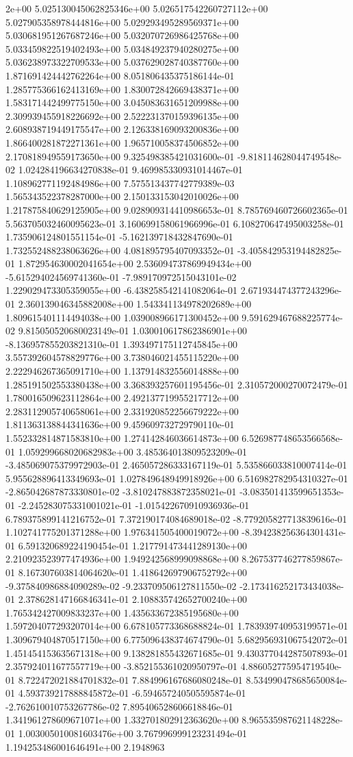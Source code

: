 2e+00	5.025130045062825346e+00	5.026517542260727112e+00	5.027905358978444816e+00	5.029293495289569371e+00	5.030681951267687246e+00	5.032070726986425768e+00	5.033459822519402493e+00	5.034849237940280275e+00	5.036238973322709533e+00	5.037629028740387760e+00
1.871691424442762264e+00	8.051806435375186144e-01	1.285775366162413169e+00	1.830072842669438371e+00	1.583171442499775150e+00	3.045083631651209988e+00	2.309939455918226692e+00	2.522231370159396135e+00	2.608938719449175547e+00	2.126338169093200836e+00	1.866400281872271361e+00	1.965710058374506852e+00	2.170818949559173650e+00	9.325498385421031600e-01	-9.818114628044749548e-02	1.024284196634270838e-01	9.469985330931014467e-01	1.108962771192484986e+00	7.575513437742779389e-03	1.565343522378287000e+00	2.150133153042010026e+00	1.217875840629125905e+00	9.028909314410986653e-01	8.785769460726602365e-01	5.563705032460095623e-01	3.160699158061966996e-01	6.108270647495003258e-01	1.735906124801551154e-01	-5.162139718432847690e-01	1.732552488238063626e+00	4.081895795407093352e-01	-3.405842953194482825e-01	1.872954630002041654e+00	2.536094737869949434e+00	-5.615294024569741360e-01	-7.989170972515043101e-02	1.229029473305359055e+00	-6.438258542141082064e-01	2.671934474377243296e-01	2.360139046345882008e+00	1.543341134978202689e+00	1.809615401114494038e+00	1.039008966171300452e+00	9.591629467688225774e-02	9.815050520680023149e-01	1.030010617862386901e+00	-8.136957855203821310e-01	1.393497175112745845e+00	3.557392604578829776e+00	3.738046021455115220e+00	2.222946267365091710e+00	1.137914832556014888e+00	1.285191502553380438e+00	3.368393257601195456e-01	2.310572000270072479e-01	1.780016509623112864e+00	2.492137719955217712e+00	2.283112905740658061e+00	2.331920852256679222e+00	1.811363138844341636e+00	9.459609732729790110e-01	1.552332814871583810e+00	1.274142846036614873e+00	6.526987748653566568e-01	1.059299668020682983e+00	3.485364013809523209e-01	-3.485069075379972903e-01	2.465057286333167119e-01	5.535866033810007414e-01	5.955628896413349693e-01	1.027849648949918926e+00	6.516982782954310327e-01	-2.865042687873330801e-02	-3.810247883872358021e-01	-3.083501413599651353e-01	-2.245283075331001021e-01	-1.015422670910936936e-01	6.789375899141216752e-01	7.372190174084689018e-02	-8.779205827713839616e-01	1.102741775201371288e+00	1.976341505400019072e+00	-8.394238256364301431e-01	6.591320689224190454e-01	1.217791473441289130e+00	2.210923523977474936e+00	1.949242568999098868e+00	8.267537746277859867e-01	8.167307603814064620e-01	1.418642697906752792e+00	-9.375840986884090289e-02	-9.233709506127811550e-02	-2.173416252173434038e-01	2.378628147166846341e-01	2.108835742652700240e+00	1.765342427009833237e+00	1.435633672385195680e+00	1.597204077293207014e+00	6.678105773368688824e-01	1.783939740953199571e-01	1.309679404870517150e+00	6.775096438374674790e-01	5.682956931067542072e-01	1.451454153635671318e+00	9.138281855432671685e-01	9.430377044287507893e-01	2.357924011677557719e+00	-3.852155361020950797e-01	4.886052775954719540e-01	8.722472021884701832e-01	7.884996167686080248e-01	8.534990478685650084e-01	4.593739217888845872e-01	-6.594657240505595874e-01	-2.762610010753267786e-02	7.895406528606618846e-01	1.341961278609671071e+00	1.332701802912363620e+00	8.965535987621148228e-01	1.003005010081603476e+00	3.767996999123231494e-01	1.194253486001646491e+00	2.1948963